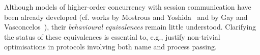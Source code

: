 Although models of higher-order concurrency with session 
communication %
have been already developed (cf. works by Mostrous and Yoshida~\cite{tlca07} and by Gay and Vasconcelos~\cite{DBLP:journals/jfp/GayV10}),
their \emph{behavioural equivalences} 
remain little understood. 
Clarifying the status of these equivalences is essential to, e.g., 
justify non-trivial optimisations in protocols involving both name and process passing.





